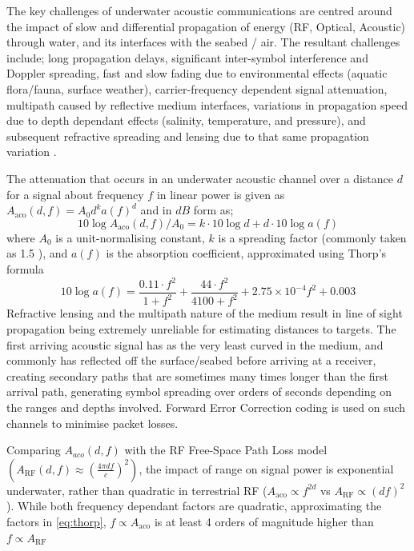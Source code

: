 \documentclass[conference]{IEEEtran}
\begin{document}
The key challenges of underwater acoustic communications are centred around the impact of slow and differential propagation of energy (RF, Optical, Acoustic) through water, and its interfaces with the seabed / air.
The resultant challenges include; long propagation delays, significant inter-symbol interference and Doppler spreading, fast and slow fading due to environmental effects (aquatic flora/fauna, surface weather), carrier-frequency dependent signal attenuation, multipath caused by reflective medium interfaces, variations in propagation speed due to depth dependant effects (salinity, temperature, and pressure), and subsequent refractive spreading and lensing due to that same propagation variation \cite{Partan2006}.

The attenuation that occurs in an underwater acoustic channel over a distance $d$ for a signal about frequency $f$ in linear power is given as $A_{\text{aco}}(d,f) = A_0d^ka(f)^d$ and in $dB$ form as;
%
\begin{equation}
  \label{eq:acoattenuationdb}
  10 \log A_{\text{aco}}(d,f)/A_0 = k \cdot 10 \log d + d \cdot 10 \log a(f)
\end{equation}
%
where $A_0$ is a unit-normalising constant, $k$ is a spreading factor (commonly taken as 1.5  \cite{Stojanovic2007}), and $a(f)$ is the absorption coefficient, approximated using Thorp's formula \cite{Brekhovskikh1991}
%
\begin{equation}
  \label{eq:thorp}
  10 \log a(f) = \frac{0.11 \cdot f^2}{1+f^2} + \frac{44\cdot f^2}{4100+f^2}+ 2.75\times10^{-4} f^2 + 0.003
\end{equation}
%
Refractive lensing and the multipath nature of the medium result in line of sight propagation being extremely unreliable for estimating distances to targets.
The first arriving acoustic signal has as the very least curved in the medium, and commonly has reflected off the surface/seabed before arriving at a receiver, creating secondary paths that are sometimes many times longer than the first arrival path, generating symbol spreading over orders of seconds depending on the ranges and depths involved.
Forward Error Correction coding is used on such channels to minimise packet losses.

Comparing $A_{aco}(d,f)$ with the RF Free-Space Path Loss model $(A_{\text{RF}}(d,f) \approx \left( \frac{4\pi d f}{c} \right)^2)$, the impact of range on signal power is exponential underwater, rather than quadratic in terrestrial RF ($A_{\text{aco}} \propto f^{2d}$ vs $A_{\text{RF}} \propto (df)^2$). 
While both frequency dependant factors are quadratic, approximating the factors in \eqref{eq:thorp}, $f\propto A_{\text{aco}}$ is at least 4 orders of magnitude higher than $f\propto A_{\text{RF}}$
\end{document}
